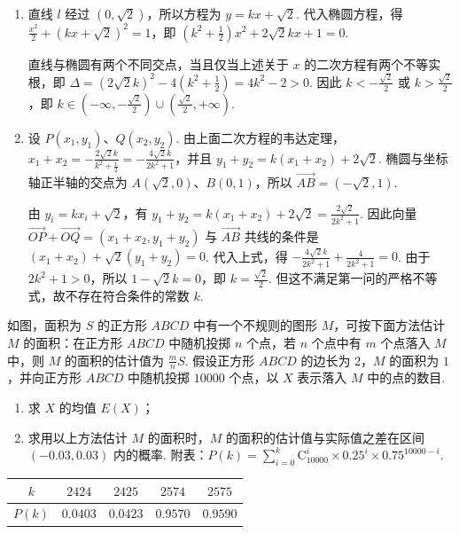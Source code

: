 \begin{solution}
\begin{enumerate}
\item 直线 \(l\) 经过 \((0,\sqrt{2})\)，所以方程为 \(y=kx+\sqrt{2}\). 代入椭圆方程，得
\(\frac{x^2}{2}+(kx+\sqrt{2})^2=1\)，即 \(\left(k^2+\frac{1}{2}\right)x^2+2\sqrt{2}kx+1=0\).

直线与椭圆有两个不同交点，当且仅当上述关于 \(x\) 的二次方程有两个不等实根，即
\(\Delta=(2\sqrt{2}k)^2-4\left(k^2+\frac{1}{2}\right)=4k^2-2>0\). 因此 \(k< -\frac{\sqrt{2}}{2}\) 或 \(k>\frac{\sqrt{2}}{2}\)，即
\(k\in\left(-\infty,-\frac{\sqrt{2}}{2}\right)\cup\left(\frac{\sqrt{2}}{2},+\infty\right)\).
\item 设 \(P(x_1,y_1)\)、\(Q(x_2,y_2)\). 由上面二次方程的韦达定理，
\(x_1+x_2=-\frac{2\sqrt{2}k}{k^2+\frac{1}{2}}=-\frac{4\sqrt{2}k}{2k^2+1}\)，并且 \(y_1+y_2=k(x_1+x_2)+2\sqrt{2}\). 椭圆与坐标轴正半轴的交点为 \(A(\sqrt{2},0)\)、\(B(0,1)\)，所以 \(\overrightarrow{AB}=(-\sqrt{2},1)\).

由 \(y_i=kx_i+\sqrt{2}\)，有 \(y_1+y_2=k(x_1+x_2)+2\sqrt{2}=\frac{2\sqrt{2}}{2k^2+1}\). 因此向量 \(\overrightarrow{OP}+\overrightarrow{OQ}=(x_1+x_2,y_1+y_2)\) 与 \(\overrightarrow{AB}\) 共线的条件是
\((x_1+x_2)+\sqrt{2}(y_1+y_2)=0\). 代入上式，得
\(-\frac{4\sqrt{2}k}{2k^2+1}+\frac{4}{2k^2+1}=0\). 由于 \(2k^2+1>0\)，所以 \(1-\sqrt{2}k=0\)，即 \(k=\frac{\sqrt{2}}{2}\). 但这不满足第一问的严格不等式，故不存在符合条件的常数 \(k\).
\end{enumerate}
\end{solution}

\begin{problem}
如图，面积为 \(S\) 的正方形 \(ABCD\) 中有一个不规则的图形 \(M\)，可按下面方法估计 \(M\) 的面积：在正方形 \(ABCD\) 中随机投掷 \(n\) 个点，若 \(n\) 个点中有 \(m\) 个点落入 \(M\) 中，则 \(M\) 的面积的估计值为 \(\frac{m}{n} S\). 假设正方形 \(ABCD\) 的边长为 \(2\)，\(M\) 的面积为 \(1\)，并向正方形 \(ABCD\) 中随机投掷 \(10000\) 个点，以 \(X\) 表示落入 \(M\) 中的点的数目.

\begin{enumerate}
\item 求 \(X\) 的均值 \(E(X)\)；
\item 求用以上方法估计 \(M\) 的面积时，\(M\) 的面积的估计值与实际值之差在区间 \((-0.03, 0.03)\) 内的概率. 附表：\(P(k)=\sum_{i=0}^{k}\mathrm C_{10000}^{i}\times 0.25^{i}\times 0.75^{10000-i}\).
\end{enumerate}

\begin{center}
\begin{tabular}{|c|c|c|c|c|}
\hline
\(k\) & \(2424\) & \(2425\) & \(2574\) & \(2575\) \\
\hline
\(P(k)\) & \(0.0403\) & \(0.0423\) & \(0.9570\) & \(0.9590\) \\
\hline
\end{tabular}
\end{center}

\end{problem}

